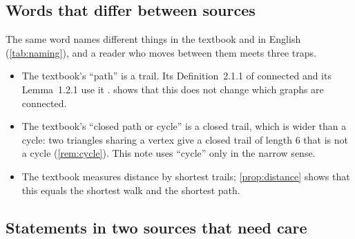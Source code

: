 \subsection{Words that differ between sources}

The same word names different things in the textbook and in English
(\cref{tab:naming}), and a reader who moves between them meets three
traps.
\begin{itemize}
\item The textbook's ``path'' is a trail. Its Definition~2.1.1 of connected
  and its Lemma~1.2.1 use it \cite[pp.~23, 48]{petrosyan2015graphs}.
   shows that this does not change which graphs are
  connected.
\item The textbook's ``closed path or cycle'' is a closed trail, which is
  wider than a cycle: two triangles sharing a vertex give a closed trail
  of length $6$ that is not a cycle (\cref{rem:cycle}). This note uses ``cycle'' only in the narrow sense.
\item The textbook measures distance by shortest trails; \cref{prop:distance}
  shows that this equals the shortest walk and the shortest path.
\end{itemize}

\subsection{Statements in two sources that need care}\label{sec:sources}

